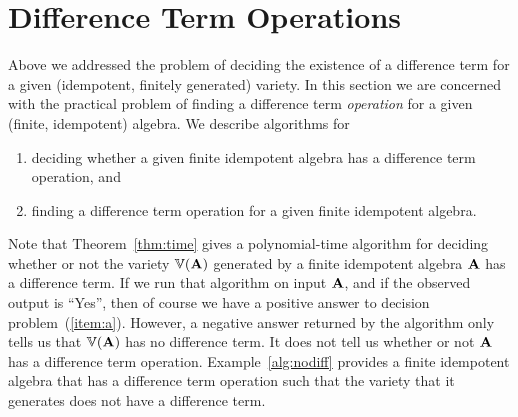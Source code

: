 \section{Difference Term Operations}
Above we addressed the problem of deciding the existence of a difference term
for a given (idempotent, finitely generated) variety.  In this section we are
concerned with the practical problem of finding a difference term
\emph{operation} for a given (finite, idempotent) algebra.
We describe algorithms for
\begin{enumerate}
\item \label{item:a} deciding whether a given finite idempotent algebra
has a difference term operation, and
\item \label{item:b} finding a difference term operation
for a given finite idempotent algebra.
\end{enumerate}
Note that Theorem~\ref{thm:time} gives a polynomial-time algorithm
for deciding whether or not the variety $\operatorname{\mathbb{V}}(\mathbf{A})$ generated by a
finite idempotent algebra $\mathbf{A}$ has a difference term.
If we run that algorithm on input $\mathbf{A}$, and if the observed
output is ``Yes'', then of course we have a positive answer to decision
problem~(\ref{item:a}).  However, a negative answer returned by the
algorithm only tells us that $\operatorname{\mathbb{V}}(\mathbf{A})$ has no difference term.
It does not tell us whether or not $\mathbf{A}$ has a difference term operation.  Example~\ref{alg:nodiff} provides a finite idempotent algebra that has a difference term operation such that the variety that it generates does not have a difference term.


